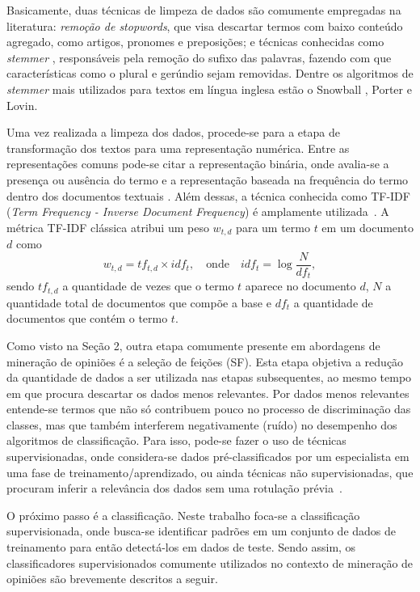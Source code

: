 \documentclass[11pt,a4paper]{article}
\begin{document}
Basicamente, duas técnicas de limpeza de dados são comumente empregadas na literatura: \textit{remoção de stopwords}, que visa descartar termos com baixo conteúdo agregado, como artigos, pronomes e preposições; e técnicas conhecidas como \textit{stemmer} \cite{Weiss:textMining}, responsáveis pela remoção do sufixo das palavras, fazendo com que características como o plural e gerúndio sejam removidas. Dentre os algoritmos de \textit{stemmer} mais utilizados para textos em língua inglesa estão o Snowball \cite{Porter:snowball}, Porter \cite{Porter:stemmer} e Lovin\cite{Lovins:Development}.

Uma vez realizada a limpeza dos dados, procede-se para a etapa de transformação dos textos para uma representação numérica. Entre as representações comuns pode-se citar a representação binária, onde avalia-se a presença ou ausência do termo e a representação baseada na frequência do termo dentro dos documentos textuais \cite{Paltoglou:Retrieval,Li:Framework}. Além dessas, a técnica conhecida como TF-IDF (\textit{Term Frequency - Inverse Document Frequency}) é amplamente utilizada~\cite{Manning:IR}. A métrica TF-IDF clássica atribui um peso $w_{t,d}$ para um termo $t$ em um documento $d$ como
\begin{equation}\label{eq:TF-IDF}
    w_{t,d}= tf_{t,d} \times idf_{t} , \quad \textrm{onde} \quad idf_{t} = \log \frac{N}{df_{t}},
\end{equation}
sendo $tf_{t,d}$ a quantidade de vezes que o termo $t$ aparece no documento $d$, $N$ a quantidade total de documentos que compõe a base e $df_{t}$ a quantidade de documentos que contém o termo $t$.


Como visto na Seção 2, outra etapa comumente presente em abordagens de mineração de opiniões é a seleção de feições (SF). Esta etapa objetiva a redução da quantidade de dados a ser utilizada nas etapas subsequentes, ao mesmo tempo em que procura descartar os dados menos relevantes. Por dados menos relevantes entende-se termos que não só contribuem pouco no processo de discriminação das classes, mas que também interferem negativamente (ruído) no desempenho dos algoritmos de classificação. Para isso, pode-se fazer o uso de técnicas supervisionadas, onde considera-se dados pré-classificados por um especialista em uma fase de treinamento/aprendizado, ou ainda técnicas não supervisionadas, que procuram inferir a relevância dos dados sem uma rotulação prévia~\cite{OKeefe:Weighting}.

O próximo passo é a classificação. Neste trabalho foca-se a classificação supervisionada, onde busca-se identificar padrões em um conjunto de dados de treinamento para então detectá-los em dados de teste. Sendo assim, os classificadores supervisionados comumente utilizados no contexto de mineração de opiniões são brevemente descritos a seguir.
\end{document}

